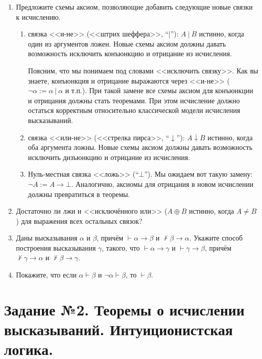 \documentclass[10pt,a4paper,oneside]{article}
\begin{document}
\begin{enumerate}
\item Предложите схемы аксиом, позволяющие добавить следующие новые связки к исчислению.
\begin{enumerate}
\item связка <<и-не>> (<<штрих шеффера>>, ``|''): $A\ |\ B$ истинно, когда один из аргументов ложен. Новые схемы аксиом должны 
давать возможность исключить конъюнкцию и отрицание из исчисления. 

Поясним, что мы понимаем под словами <<исключить связку>>.
Как вы знаете, конъюнкция и отрицание выражаются через <<и-не>> ($\neg \alpha := \alpha\ |\ \alpha$ и т.п.). 
При такой замене все схемы аксиом для конъюнкции и отрицания должны стать теоремами.
При этом исчисление должно остаться корректным относительно классической модели исчисления высказываний.

\item связка <<или-не>> (<<стрелка пирса>>, ``$\downarrow$''): $A \downarrow B$ истинно, когда оба аргумента ложны.
Новые схемы аксиом должны давать возможность исключить дизъюнкцию и отрицание из исчисления.
\item Нуль-местная связка <<ложь>> (``$\bot$''). Мы ожидаем вот такую замену: $\neg A := A \rightarrow \bot$.
Аналогично, аксиомы для отрицания в новом исчислении должны превратиться в теоремы. 
\end{enumerate}

\item Достаточно ли лжи и <<исключённого или>> ($A \oplus B$ истинно, когда $A \ne B$) для выражения
всех остальных связок? 

\item Даны высказывания $\alpha$ и $\beta$, причём $\vdash \alpha\rightarrow\beta$ и $\not\vdash\beta\rightarrow\alpha$. 
Укажите способ построения высказывания $\gamma$, такого, что
$\vdash\alpha\rightarrow\gamma$ и $\vdash\gamma\rightarrow\beta$, причём $\not\vdash\gamma\rightarrow\alpha$ и
$\not\vdash\beta\rightarrow\gamma$.

\item Покажите, что если $\alpha \vdash \beta$ и $\neg\alpha\vdash\beta$, то $\vdash\beta$.
\end{enumerate}

\section*{Задание №2. Теоремы о исчислении высказываний. Интуиционистская логика.}
\end{document}
